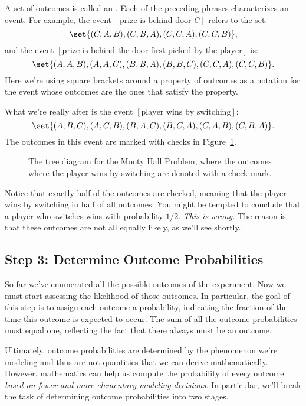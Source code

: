 A set of outcomes is called an .  Each of the preceding
phrases characterizes an event.  For example, the event
$[\text{prize is behind door $C$}]$ refers to the set:
%
\[
    \set{(C, A, B), (C, B, A), (C, C, A), (C, C, B)},
\]
%
and the event $[\text{prize is behind the door first picked
    by the player}]$ is:
%
\[
    \set{(A, A, B), (A, A, C), (B, B, A), (B, B, C), (C, C, A), (C, C, B)}.
\]
%
Here we're using square brackets around a property of outcomes as a
notation for the event whose outcomes are the ones that satisfy the
property.

What we're really after is the event $[\text{player wins by switching}]$:
\begin{equation}\label{swwin-event}
\set{(A, B, C), (A, C, B), (B, A, C), (B, C, A), (C, A, B), (C, B, A)}.
\end{equation}
The outcomes in this event are marked with checks in Figure~\ref{fig:14A4}.
\begin{figure}


\caption{The tree diagram for the Monty Hall Problem, where the
  outcomes where the player wins by switching are denoted with a
  check mark.}

\label{fig:14A4}

\end{figure}

Notice that exactly half of the outcomes are checked, meaning that the
player wins by switching in half of all outcomes.  You might be
tempted to conclude that a player who switches wins with probability
$1/2$.  \emph{This is wrong.}  The reason is that these outcomes are
not all equally likely, as we'll see shortly.

\subsection{Step 3: Determine Outcome Probabilities}

So far we've enumerated all the possible outcomes of the experiment.
Now we must start assessing the likelihood of those outcomes.  In
particular, the goal of this step is to assign each outcome a
probability, indicating the fraction of the time this outcome is
expected to occur.  The sum of all the outcome probabilities must
equal one, reflecting the fact that there always must be an outcome.

Ultimately, outcome probabilities are determined by the phenomenon
we're modeling and thus are not quantities that we can derive
mathematically.  However, mathematics can help us compute the
probability of every outcome \emph{based on fewer and more
elementary modeling decisions.}  In particular, we'll break the task
of determining outcome probabilities into two stages.

